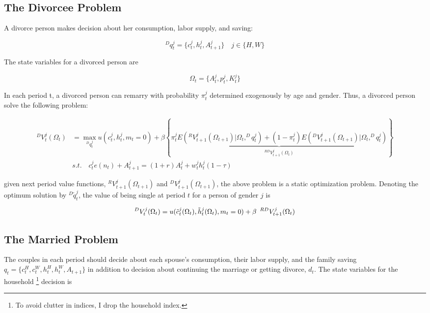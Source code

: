 \subsection{The Divorcee Problem}
A divorce person makes decision about her consumption, labor supply, and saving:

\begin{equation*}
 ^{D}q_t^j = \{c_t^j, h_t^j, A_{t+1}^j \} \quad  j \in \{H, W\}
\end{equation*}

\noindent The state variables for a divorced person are 

\begin{equation*}
\Omega_t = \{ A_t^j, p_t^j, K_t^j \} 
\end{equation*}

\noindent In each period t, a divorced person can remarry with probability $\pi_t^j$  determined exogenously by age and gender. Thus, a divorced person solve the following problem: 

\begin{align*}
^{D}V_t^j (\Omega_t) &= \max_{^{D}q_t^j} u(c_t^j, h_t^j, m_t = 0) + \beta \left \{ \underbrace{\pi_t^j  E \left (^{R}V_{t+1}^j (\Omega_{t+1}) | \Omega_t, ^{D}q_t^j  \right )+ (1-\pi_t^j ) E \left (^{D}V_{t+1}^j (\Omega_{t+1}) | \Omega_t, ^{D}q_t^j  \right )}_{^{RD}V^j_{t+1} (\Omega_t)}\right \} \\
& s.t. \quad  c_t^j e(n_t) + A_{t+1}^j = (1+r) A_t^j + w_t^j h_t^j (1 - \tau)
\end{align*}

given next period value functions, $^{R}V_{t+1}^j (\Omega_{t+1})$ and $^{D}V_{t+1}^j (\Omega_{t+1})$, the above problem is a static optimization problem. Denoting the optimum solution by $^{D}\tilde q_t^j$, the value of being single at period $t$ for a person of gender $j$ is

\begin{equation*}
^{D}V_t^j (\Omega_t) = u(\tilde c_t^j (\Omega_t), \tilde h_t^j(\Omega_t), m_t = 0) + \beta \enskip ^{RD}V^j_{t+1} (\Omega_t)
\end{equation*}


\subsection{The Married Problem}

The couples in each period should decide about each spouse's consumption, their labor supply, and the family saving $q_t = \{c_t^H, c_t^W, h_t^H, h_t^W,A_{t+1}\}$ in addition to decision about continuing the marriage or getting divorce, $d_t$. The state variables for the household \footnote{ To avoid clutter in indices, I drop the household index.} decision is 

